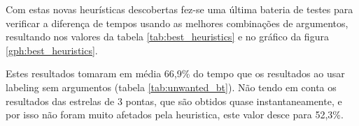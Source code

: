 Com estas novas heurísticas descobertas fez-se uma última bateria de testes para verificar a diferença de tempos usando as melhores combinações de argumentos, resultando nos valores da tabela \ref{tab:best_heuristics} e no gráfico da figura \ref{gph:best_heuristics}.

Estes resultados tomaram em média 66,9\% do tempo que os resultados ao usar labeling sem argumentos (tabela \ref{tab:unwanted_bt}). Não tendo em conta os resultados das estrelas de 3 pontas, que são obtidos quase instantaneamente, e por isso não foram muito afetados pela heuristica, este valor desce para 52,3\%.


